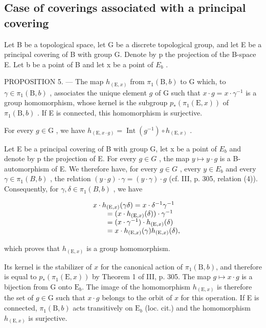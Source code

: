 \subsection{Case of coverings associated with a principal covering}

Let B be a topological space, let G be a discrete topological group, and let E be a principal covering of B with group G. Denote by p the projection of the B-space E. Let b be a point of B and let x be a point of \(E_{b}\) .

PROPOSITION 5. --- The map \(h_{(\mathrm{E},x)}\) from \(\pi_1(\mathrm{B},b)\) to G which, to \(\gamma \in \pi_1(\mathrm{B},b)\) , associates the unique element \(g\) of G such that \(x \cdot g = x \cdot \gamma^{-1}\) is a group homomorphism, whose kernel is the subgroup \(p_*(\pi_1(\mathrm{E},x))\) of \(\pi_1(\mathrm{B},b)\) . If E is connected, this homomorphism is surjective.

For every \(g \in \mathrm{G}\) , we have \(h_{(\mathrm{E},x \cdot g)} = \operatorname{Int}(g^{-1}) \circ h_{(\mathrm{E},x)}\) .

Let E be a principal covering of B with group G, let x be a point of \(E_{b}\) and denote by p the projection of E. For every \(g \in G\) , the map \(y \mapsto y \cdot g\) is a B-automorphism of E. We therefore have, for every \(g \in G\) , every \(y \in E_{b}\) and every \(\gamma \in \pi_{1}(B, b)\) , the relation \((y \cdot g) \cdot \gamma = (y \cdot \gamma) \cdot g\) (cf. III, p. 305, relation (4)). Consequently, for \(\gamma, \delta \in \pi_{1}(B, b)\) , we have

\[
\begin{array}{r l} & {x \cdot h _ {(\mathrm{E}, x)} (\gamma \delta) = x \cdot \delta^ {- 1} \gamma^ {- 1}} \\ & {\qquad = (x \cdot h _ {(\mathrm{E}, x)} (\delta)) \cdot \gamma^ {- 1}} \\ & {\qquad = (x \cdot \gamma^ {- 1}) \cdot h _ {(\mathrm{E}, x)} (\delta)} \\ & {\qquad = x \cdot h _ {(\mathrm{E}, x)} (\gamma) h _ {(\mathrm{E}, x)} (\delta),} \end{array}
\]

which proves that \(h_{(\mathrm{E},x)}\) is a group homomorphism.

Its kernel is the stabilizer of \(x\) for the canonical action of \(\pi_1(\mathrm{B}, b)\), and therefore is equal to \(p_*(\pi_1(\mathrm{E}, x))\) by Theorem 1 of III, p. 305. The map \(g \mapsto x \cdot g\) is a bijection from G onto \(\mathrm{E}_b\). The image of the homomorphism \(h_{(\mathrm{E}, x)}\) is therefore the set of \(g \in \mathrm{G}\) such that \(x \cdot g\) belongs to the orbit of \(x\) for this operation. If E is connected, \(\pi_1(\mathrm{B}, b)\) acts transitively on \(\mathrm{E}_b\) (loc. cit.) and the homomorphism \(h_{(\mathrm{E}, x)}\) is surjective.

